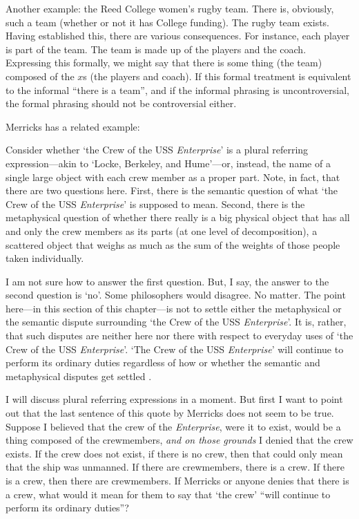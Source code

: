 \documentclass[11pt]{article}
\newenvironment{squote}{%
\begin{spacing}{1}
       	\begin{list}{}{%
\setlength{\labelwidth}{0pt}%
\rightmargin\leftmargin%
}
\item\relax
}{%
\end{list}%
\end{spacing}
}
\begin{document}
\begin{spacing}{1.25}
Another example: the Reed College women's rugby team.  There is,
obviously, such a team (whether or not it has College funding).  The
rugby team exists.  Having established this, there are various
consequences.  For instance, each player is part of the team.  The
team is made up of the players and the coach.  Expressing this
formally, we might say that there is some thing (the team) composed of
the $x$s (the players and coach).  If this formal treatment is
equivalent to the informal ``there is a team'', and if the informal
phrasing is uncontroversial, the formal phrasing should not be
controversial either.

Merricks has a related example:

\begin{squote}
Consider whether `the Crew of the USS {\em Enterprise}' is a plural
referring expression---akin to `Locke, Berkeley, and Hume'---or,
instead, the name of a single large object with each crew member as a
proper part.  Note, in fact, that there are two questions here.
First, there is the semantic question of what `the Crew of the USS
{\em Enterprise}' is supposed to mean.  Second, there is the
metaphysical question of whether there really is a big physical object
that has all and only the crew members as its parts (at one level of
decomposition), a scattered object that weighs as much as the sum of
the weights of those people taken individually.

I am not sure how to answer the first question.  But, I say, the
answer to the second question is `no'.  Some philosophers would
disagree.  No matter.  The point here---in this section of this
chapter---is not to settle either the metaphysical or the semantic
dispute surrounding `the Crew of the USS {\em Enterprise}'.  It is,
rather, that such disputes are neither here nor there with respect to
everyday uses of `the Crew of the USS {\em Enterprise}'.  `The Crew of
the USS {\em Enterprise}' will continue to perform its ordinary duties
regardless of how or whether the semantic and metaphysical disputes
get settled \citeyearpar[10]{merricks2001a}.
\end{squote}

I will discuss plural referring expressions in a moment.  But first I
want to point out that the last sentence of this quote by Merricks
does not seem to be true.  Suppose I believed that the crew of the
{\em Enterprise}, were it to exist, would be a thing composed of the
crewmembers, {\em and on those grounds} I denied that the crew exists.
If the crew does not exist, if there is no crew, then that could only
mean that the ship was unmanned.  If there are crewmembers, there is a
crew.  If there is a crew, then there are crewmembers.  If Merricks or
anyone denies that there is a crew, what would it mean for them to say
that `the crew' ``will continue to perform its ordinary duties''?


\end{spacing}
\end{document}
